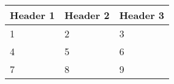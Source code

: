 \documentclass{article}
\begin{document}
\begin{tabular}{|l|l|l|}
\hline
Header 1 & Header 2 & Header 3 \\
\hline
1 & 2 & 3 \\
\hline
4 & 5 & 6 \\
\hline
7 & 8 & 9 \\
\hline
\end{tabular}
\end{document}
